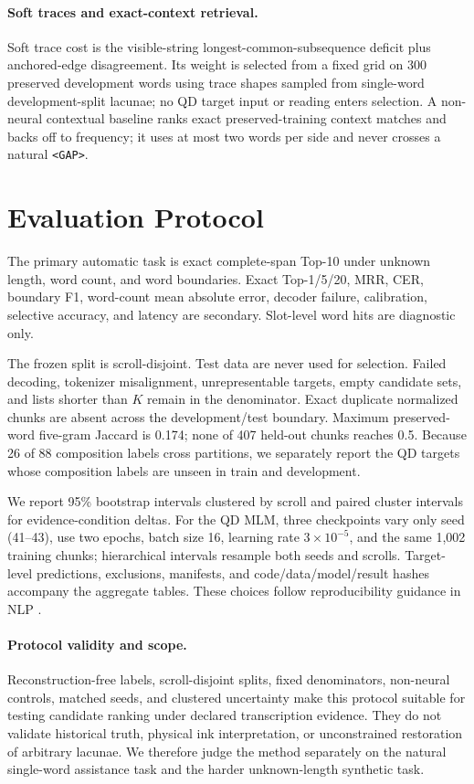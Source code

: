 \documentclass[10pt,twocolumn,a4paper]{article}
\begin{document}
\paragraph{Soft traces and exact-context retrieval.}
Soft trace cost is the visible-string longest-common-subsequence deficit plus anchored-edge disagreement. Its weight is selected from a fixed grid on 300 preserved development words using trace shapes sampled from single-word development-split lacunae; no QD target input or reading enters selection. A non-neural contextual baseline ranks exact preserved-training context matches and backs off to frequency; it uses at most two words per side and never crosses a natural \texttt{<GAP>}.

\section{Evaluation Protocol}

The primary automatic task is exact complete-span Top-10 under unknown length, word count, and word boundaries. Exact Top-1/5/20, MRR, CER, boundary F1, word-count mean absolute error, decoder failure, calibration, selective accuracy, and latency are secondary. Slot-level word hits are diagnostic only.

The frozen split is scroll-disjoint. Test data are never used for selection. Failed decoding, tokenizer misalignment, unrepresentable targets, empty candidate sets, and lists shorter than $K$ remain in the denominator. Exact duplicate normalized chunks are absent across the development/test boundary. Maximum preserved-word five-gram Jaccard is 0.174; none of 407 held-out chunks reaches 0.5. Because 26 of 88 composition labels cross partitions, we separately report the QD targets whose composition labels are unseen in train and development.

We report 95\% bootstrap intervals clustered by scroll and paired cluster intervals for evidence-condition deltas. For the QD MLM, three checkpoints vary only seed (41--43), use two epochs, batch size 16, learning rate $3\times10^{-5}$, and the same 1,002 training chunks; hierarchical intervals resample both seeds and scrolls. Target-level predictions, exclusions, manifests, and code/data/model/result hashes accompany the aggregate tables. These choices follow reproducibility guidance in NLP \cite{dodge2019,lourie2024}.

\paragraph{Protocol validity and scope.}
Reconstruction-free labels, scroll-disjoint splits, fixed denominators, non-neural controls, matched seeds, and clustered uncertainty make this protocol suitable for testing candidate ranking under declared transcription evidence. They do not validate historical truth, physical ink interpretation, or unconstrained restoration of arbitrary lacunae. We therefore judge the method separately on the natural single-word assistance task and the harder unknown-length synthetic task.
\end{document}
